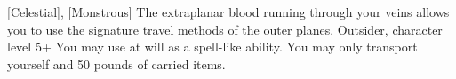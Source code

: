  {[Celestial], [Monstrous]}
\shortdescfeat
{The extraplanar blood running through your veins allows you to use the signature travel methods of the outer planes.}
{Outsider, character level 5+}
{You may use  at will as a spell-like ability. You may only transport yourself and 50 pounds of carried items.}